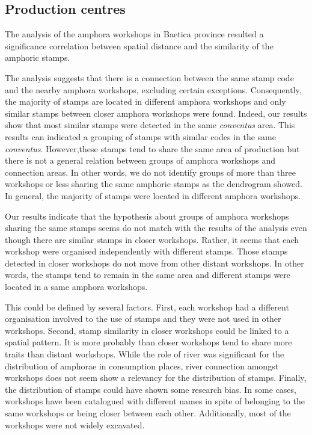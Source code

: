 \documentclass[review]{elsarticle}
\begin{document}
\subsection{Production centres}

The analysis of the amphora workshops in Baetica province resulted a significance correlation between spatial distance and the similarity of the amphoric stamps. 

The analysis suggests that there is  a connection between the same stamp code and the nearby amphora workshops, excluding certain exceptions. Consequently, the majority of stamps are located in different amphora workshops and only similar stamps between closer amphora workshops were found. Indeed, our results show that most similar stamps were detected in the same \textit{conventus} area. This results can indicated a grouping of stamps with similar codes in the same \textit{conventus}. However,these stamps tend to share the same area of production but there is not a general relation between groups of amphora workshops and connection areas. In other words, we do not identify groups of more than three workshops or less sharing the same amphoric stamps as the dendrogram showed. In general, the majority of stamps were located in different amphora workshops. 


Our results indicate that the hypothesis about groups of amphora workshops sharing the same stamps seems do not match with the results of the analysis even though there are similar stamps in closer workshops. Rather, it seems that each workshop were organised independently with different stamps. Those stamps detected in closer workshops do not move from other distant workshops. In other words, the stamps tend to remain in the same area and different stamps were located in a same amphora workshops. 

This could be defined by several factors. First, each workshop had a different organisation involved to the use of stamps and they were not used in other workshops. Second, stamp similarity in closer workshops could be linked to a spatial pattern. It is more probably than closer workshops tend to share more traits than distant workshops. While the role of river was significant for the distribution of amphorae in consumption places, river connection amongst workshops does not seem show a relevancy for the distribution of stamps. Finally, the distribution of stamps could have shown some research bias. In some cases, workshops have been catalogued with different names in spite of belonging to the same workshops or being closer between each other. Additionally, most of the workshops were not widely excavated. 
\end{document}

